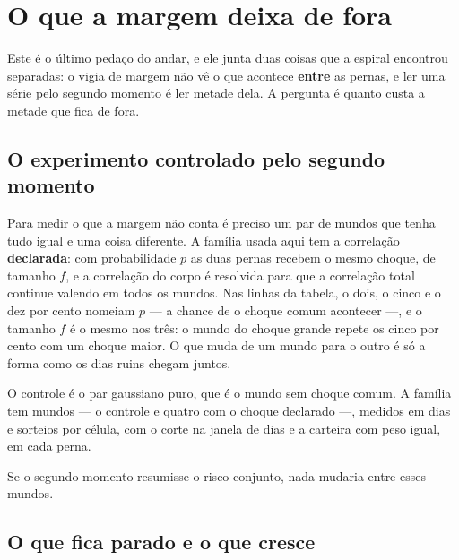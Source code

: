 \chapter{O que a margem deixa de fora}\label{cap:margem}

Este é o último pedaço do andar, e ele junta duas coisas que a espiral encontrou separadas: o vigia
de margem não vê o que acontece \textbf{entre} as pernas, e ler uma série pelo segundo momento é ler
metade dela. A pergunta é quanto custa a metade que fica de fora.

\section{O experimento controlado pelo segundo momento}

Para medir o que a margem não conta é preciso um par de mundos que tenha tudo igual e uma coisa
diferente. A família usada aqui tem a correlação \textbf{declarada}: com probabilidade $p$ as duas pernas
recebem o mesmo choque, de tamanho $f$, e a correlação do corpo é resolvida para que a correlação
total continue valendo \numMargemRho{} em todos os mundos. Nas linhas da tabela, o dois, o cinco e o dez
por cento nomeiam $p$ --- a chance de o choque comum acontecer ---, e o tamanho $f$ é o mesmo nos três:
o mundo do choque grande repete os cinco por cento com um choque maior. O que muda de um mundo para o outro é só
a forma como os dias ruins chegam juntos.

O controle é o par gaussiano puro, que é o mundo sem choque comum. A família tem \numMargemMundos{} mundos --- o controle e
quatro com o choque declarado ---, medidos em \numMargemDias{} dias e
\numMargemSementes{} sorteios por célula, com o corte na janela de \numMargemJanela{} dias e a
carteira com peso igual, \numMargemPeso{} em cada perna.

Se o segundo momento resumisse o risco conjunto, nada mudaria entre esses mundos.

\section{O que fica parado e o que cresce}

